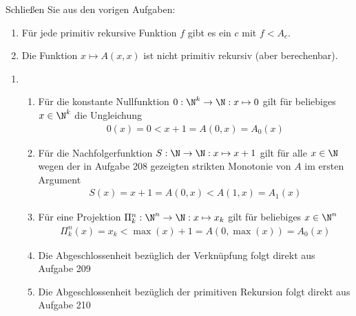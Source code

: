 
\begin{exercise}[211]

Schließen Sie aus den vorigen Aufgaben:
\begin{enumerate}[label = \alph*.]
  \item Für jede primitiv rekursive Funktion $f$ gibt es ein $c$ mit $f < A_c$.
  \item Die Funktion $x \mapsto A(x,x)$ ist nicht primitiv rekursiv (aber berechenbar).
\end{enumerate}

\end{exercise}


\begin{solution}
	\phantom{}
	\begin{enumerate}[label = \alph*.]
		\item
			\begin{enumerate}[label = \arabic*.]
				\item Für die konstante Nullfunktion $0: \N^k \to \N: x \mapsto 0$ gilt für beliebiges $x \in \N^k$ die Ungleichung 
					\begin{align*}
					0(x) = 0 < x + 1 = A(0, x) = A_0(x)
					\end{align*}
				
				\item Für die Nachfolgerfunktion $S: \N \to \N: x \mapsto x + 1$ gilt für alle $x \in \N$ wegen der in Aufgabe 208 gezeigten strikten Monotonie von $A$ im ersten Argument
					\begin{align*}
					S(x) = x + 1 = A(0, x) < A(1, x) = A_1(x)
					\end{align*} 
				
				\item Für eine Projektion $\Pi_k^n: \N^n \to \N: x \mapsto x_k$ gilt für beliebiges $x \in \N^n$
				\begin{align*}
				\Pi_k^n(x) = x_k < \max(x) + 1 = A(0, \max(x)) = A_0(x)
				\end{align*}
				
				\item Die Abgeschlossenheit bezüglich der Verknüpfung folgt direkt aus Aufgabe 209
				
				\item Die Abgeschlossenheit bezüglich der primitiven Rekursion folgt direkt aus Aufgabe 210
			\end{enumerate} 
	\end{enumerate}
	
\end{solution}
